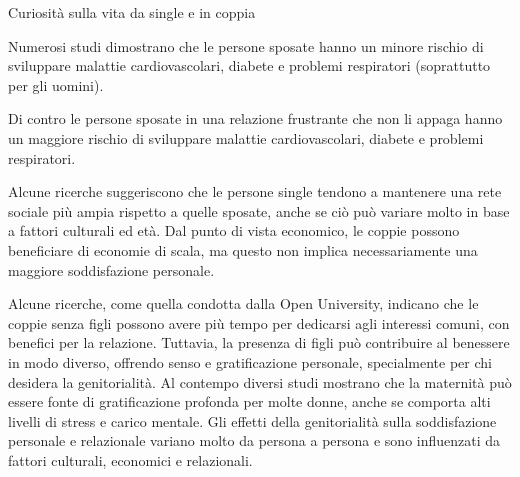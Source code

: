 \documentclass[12pt]{book} %
\begin{document}
\begin{mdframed}[linewidth=1pt]
Curiosità sulla vita da single e in coppia

Numerosi studi dimostrano che le persone sposate hanno un minore rischio di sviluppare malattie cardiovascolari, diabete
e problemi respiratori (soprattutto per gli uomini).

Di contro le persone sposate in una relazione frustrante che non li appaga hanno un maggiore rischio di sviluppare
malattie cardiovascolari, diabete e problemi respiratori.

Alcune ricerche suggeriscono che le persone single tendono a mantenere una rete sociale più ampia rispetto a quelle sposate, anche se ciò può variare molto in base a fattori culturali ed età. Dal punto di vista economico, le coppie possono beneficiare di economie di scala, ma questo non implica necessariamente una maggiore soddisfazione personale.

Alcune ricerche, come quella condotta dalla Open University, indicano che le coppie senza figli possono avere più tempo per dedicarsi agli interessi comuni, con benefici per la relazione. Tuttavia, la presenza di figli può contribuire al benessere in modo diverso, offrendo senso e gratificazione personale, specialmente per chi desidera la genitorialità. Al contempo diversi studi mostrano che la maternità può essere fonte di gratificazione profonda per molte donne, anche se comporta alti livelli di stress e carico mentale. Gli effetti della genitorialità sulla soddisfazione personale e relazionale variano molto da persona a persona e sono influenzati da fattori culturali, economici e relazionali.
\end{mdframed}
\end{document}
